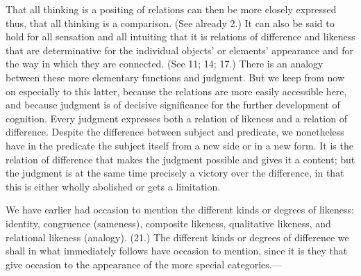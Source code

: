 \documentclass[12pt,a4paper]{book}
\newcommand{\opage}[1]{\marginnote{\footnotesize\textit{[#1]}}}
\begin{document}
That all thinking is a positing of relations can then be more closely
expressed thus, that all thinking is a comparison. (See already 2.) It can
also be said to hold for all sensation and all intuiting that it is relations
of difference and likeness that are determinative for the individual objects'
or elements' appearance and for the way in which they are connected. (See
11; 14; 17.) There is an analogy between these more elementary functions and
judgment. But we keep from now on especially to this latter, because the
relations are more easily accessible here, and because judgment is of
decisive significance for the further development of cognition. Every
judgment expresses both a relation of likeness and a relation of difference.
Despite the difference between subject and predicate, we nonetheless have in
the predicate the subject itself from a new side or in a new form. It is the
relation of difference that makes the judgment possible and gives it a
content; but the judgment is at the same time precisely a victory over the
difference, in that this is either wholly abolished or gets a limitation.

We have earlier had occasion to mention the different kinds or degrees of
likeness: identity, congruence (sameness), composite likeness, qualitative
likeness, and relational likeness (analogy). (21.) The different kinds or
degrees of difference we shall in what immediately follows have \opage{161}occasion to
mention, since it is they that give occasion to the appearance of the more
special categories.---
\end{document}
